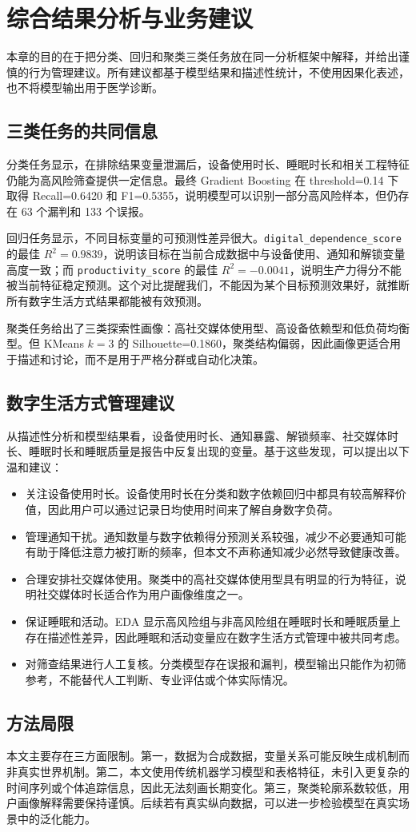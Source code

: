 \section{综合结果分析与业务建议}

本章的目的在于把分类、回归和聚类三类任务放在同一分析框架中解释，并给出谨慎的行为管理建议。所有建议都基于模型结果和描述性统计，不使用因果化表述，也不将模型输出用于医学诊断。

\subsection{三类任务的共同信息}

分类任务显示，在排除结果变量泄漏后，设备使用时长、睡眠时长和相关工程特征仍能为高风险筛查提供一定信息。最终 Gradient Boosting 在 threshold=0.14 下取得 Recall=0.6420 和 F1=0.5355，说明模型可以识别一部分高风险样本，但仍存在 63 个漏判和 133 个误报。

回归任务显示，不同目标变量的可预测性差异很大。\texttt{digital\_dependence\_score} 的最佳 $R^2=0.9839$，说明该目标在当前合成数据中与设备使用、通知和解锁变量高度一致；而 \texttt{productivity\_score} 的最佳 $R^2=-0.0041$，说明生产力得分不能被当前特征稳定预测。这个对比提醒我们，不能因为某个目标预测效果好，就推断所有数字生活方式结果都能被有效预测。

聚类任务给出了三类探索性画像：高社交媒体使用型、高设备依赖型和低负荷均衡型。但 KMeans $k=3$ 的 Silhouette=0.1860，聚类结构偏弱，因此画像更适合用于描述和讨论，而不是用于严格分群或自动化决策。

\subsection{数字生活方式管理建议}

从描述性分析和模型结果看，设备使用时长、通知暴露、解锁频率、社交媒体时长、睡眠时长和睡眠质量是报告中反复出现的变量。基于这些发现，可以提出以下温和建议：

\begin{itemize}
  \item 关注设备使用时长。设备使用时长在分类和数字依赖回归中都具有较高解释价值，因此用户可以通过记录日均使用时间来了解自身数字负荷。
  \item 管理通知干扰。通知数量与数字依赖得分预测关系较强，减少不必要通知可能有助于降低注意力被打断的频率，但本文不声称通知减少必然导致健康改善。
  \item 合理安排社交媒体使用。聚类中的高社交媒体使用型具有明显的行为特征，说明社交媒体时长适合作为用户画像维度之一。
  \item 保证睡眠和活动。EDA 显示高风险组与非高风险组在睡眠时长和睡眠质量上存在描述性差异，因此睡眠和活动变量应在数字生活方式管理中被共同考虑。
  \item 对筛查结果进行人工复核。分类模型存在误报和漏判，模型输出只能作为初筛参考，不能替代人工判断、专业评估或个体实际情况。
\end{itemize}

\subsection{方法局限}

本文主要存在三方面限制。第一，数据为合成数据，变量关系可能反映生成机制而非真实世界机制。第二，本文使用传统机器学习模型和表格特征，未引入更复杂的时间序列或个体追踪信息，因此无法刻画长期变化。第三，聚类轮廓系数较低，用户画像解释需要保持谨慎。后续若有真实纵向数据，可以进一步检验模型在真实场景中的泛化能力。
